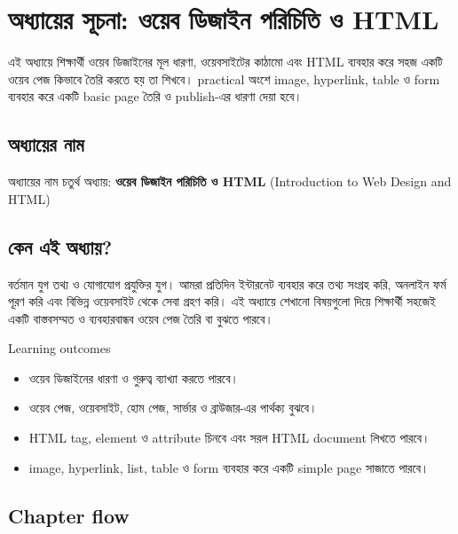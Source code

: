 \section{অধ্যায়ের সূচনা: ওয়েব ডিজাইন পরিচিতি ও HTML}

\begin{learningbox}
এই অধ্যায়ে শিক্ষার্থী ওয়েব ডিজাইনের মূল ধারণা, ওয়েবসাইটের কাঠামো এবং HTML ব্যবহার করে সহজ একটি ওয়েব পেজ কিভাবে তৈরি করতে হয় তা শিখবে। practical অংশে image, hyperlink, table ও form ব্যবহার করে একটি basic page তৈরি ও publish-এর ধারণা দেয়া হবে।
\end{learningbox}

\subsection{অধ্যায়ের নাম}
\begin{definitionbox}{অধ্যায়ের নাম}
চতুর্থ অধ্যায়: \textbf{ওয়েব ডিজাইন পরিচিতি ও HTML} (Introduction to Web Design and HTML)
\end{definitionbox}

\subsection{কেন এই অধ্যায়?}
বর্তমান যুগ তথ্য ও যোগাযোগ প্রযুক্তির যুগ। আমরা প্রতিদিন ইন্টারনেট ব্যবহার করে তথ্য সংগ্রহ করি, অনলাইন ফর্ম পূরণ করি এবং বিভিন্ন ওয়েবসাইট থেকে সেবা গ্রহণ করি। এই অধ্যায়ে শেখানো বিষয়গুলো দিয়ে শিক্ষার্থী সহজেই একটি বাস্তবসম্মত ও ব্যবহারবান্ধব ওয়েব পেজ তৈরি বা বুঝতে পারবে।

\begin{keypointbox}{Learning outcomes}
\begin{itemize}
\item ওয়েব ডিজাইনের ধারণা ও গুরুত্ব ব্যাখ্যা করতে পারবে।
\item ওয়েব পেজ, ওয়েবসাইট, হোম পেজ, সার্ভার ও ব্রাউজার-এর পার্থক্য বুঝবে।
\item HTML tag, element ও attribute চিনবে এবং সরল HTML document লিখতে পারবে।
\item image, hyperlink, list, table ও form ব্যবহার করে একটি simple page সাজাতে পারবে।
\end{itemize}
\end{keypointbox}

\subsection{Chapter flow}
\begin{center}
\end{center}

